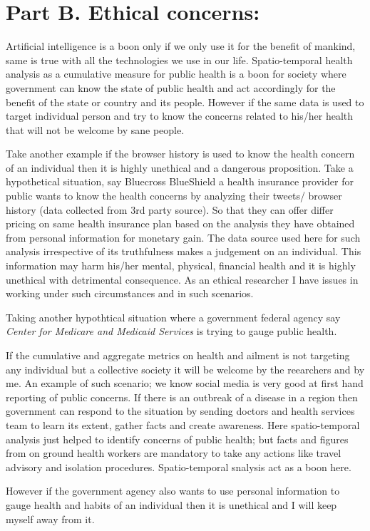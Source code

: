 \section{Part B. Ethical concerns:}
\label{part_b}
Artificial intelligence is a boon only if we only use it for the benefit of mankind, same is true with all the technologies we use in our life. Spatio-temporal health analysis as a cumulative measure for public health is a boon for society where government can know the state of public health and act accordingly for the benefit of the state or country and its people. However if the same data is used to target individual person and try to know the concerns related to his/her health that will not be welcome by sane people.

Take another example if the browser history is used to know the health concern of an individual then it is highly unethical and a dangerous proposition. Take a hypothetical situation, say Bluecross BlueShield a health insurance provider for public wants to know the health concerns by analyzing their tweets/ browser history (data collected from 3rd party source). So that they can offer differ pricing on same health insurance plan based on the analysis they have obtained from personal information for monetary gain. The data source used here for such analysis irrespective of its truthfulness makes a judgement on an individual. This information may harm his/her mental, physical, financial health and it is highly unethical with detrimental consequence. As an ethical researcher I have issues in working under such circumstances and in such scenarios.


Taking another hypothtical situation where a government federal agency say {\em Center for Medicare and Medicaid Services} is trying to gauge public health.

 If the cumulative and aggregate metrics on health and ailment is not targeting any individual but a collective society it will be welcome by the reearchers and by me. An example of such scenario; we know social media is very good at first hand reporting of public concerns. If there is an outbreak of a disease in a region then government can respond to the situation by sending doctors and health services team to learn its extent, gather facts and create awareness. Here spatio-temporal analysis just helped to identify concerns of public health; but facts and figures from on ground health workers are mandatory to take any actions like travel advisory and isolation procedures. Spatio-temporal snalysis act as a boon here.

However if the government agency also wants to use personal information to gauge health and habits of an individual then it is unethical and I will keep myself away from it.

